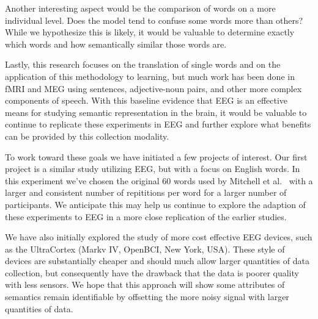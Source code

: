 Another interesting aspect would be the comparison of words on a more 
individual level. Does the model tend to confuse some words more than others?  
While we hypothesize this is likely, it would be valuable to determine exactly 
which words and how semantically similar those words are.

Lastly, this research focuses on the translation of single words and on the 
application of this methodology to learning, but much work has been done in 
fMRI and MEG using sentences, adjective-noun pairs, and other more complex 
components of speech. With this baseline evidence that EEG is an effective 
means for studying semantic representation in the brain, it would be valuable 
to continue to replicate these experiments in EEG and further explore what 
benefits can be provided by this collection modality.

To work toward these goals we have initiated a few projects of interest. Our 
first project is a similar study utilizing EEG, but with a focus on English 
words. In this experiment we've chosen the original 60 words used by Mitchell 
et al.~\cite{Mitchell2008} with a larger and consistent number of repititions 
per word for a larger number of participants.  We anticipate this may help us 
continue to explore the adaption of these experiments to EEG in a more close 
replication of the earlier studies.

We have also initially explored the study of more cost effective EEG devices, 
such as the UltraCortex (Markv IV, OpenBCI, New York, USA). These style of 
devices are substantially cheaper and should much allow larger quantities of 
data collection, but consequently have the drawback that the data is poorer 
quality with less sensors.  We hope that this approach will show some 
attributes of semantics remain identifiable by offsetting the more noisy signal 
with larger quantities of data.
